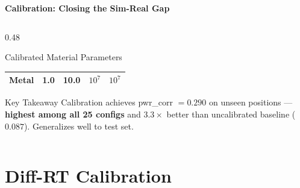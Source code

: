 \documentclass[
    aspectratio=169
]{beamer}
\begin{document}
\begin{frame}{\textbf{Calibration: Closing the Sim-Real Gap}}
\begin{columns}[T]
\begin{column}{0.48\textwidth}
\begin{block}{Calibrated Material Parameters}
\begin{tabular}{rcccc}
Metal & 1.0 & \textbf{10.0} & $10^7$ & $10^7$ \\
\bottomrule
\end{tabular}
\end{block}
\normalsize
\vspace{0.1cm}
\begin{block}{\footnotesize Key Takeaway}
\footnotesize
Calibration achieves pwr\_corr $= 0.290$ on unseen positions --- \textbf{highest among all 25 configs} and $3.3\times$ better than uncalibrated baseline ($0.087$). Generalizes well to test set.
\end{block}
\end{column}
\end{columns}
\end{frame}

\section{Diff-RT Calibration}
\end{document}
